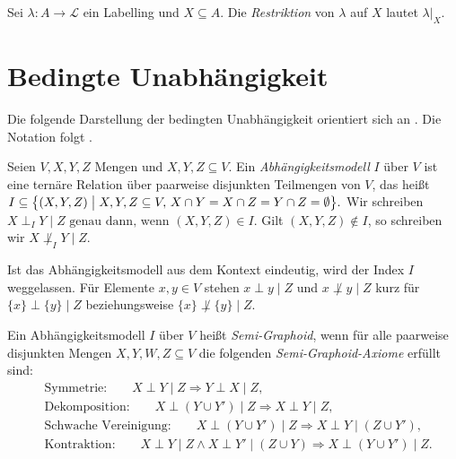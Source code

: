 \begin{Definition}
    \label{def:labelling-restriction}
    Sei \(\lambda\colon A\to\mathcal{L}\) ein Labelling und \(X\subseteq A\).
    Die \emph{Restriktion} von \(\lambda\) auf \(X\) lautet
    \(
        \lambda|_X
    \).
\end{Definition}

\section{Bedingte Unabhängigkeit}
\label{sec:conditional-independence}

Die folgende Darstellung der bedingten Unabhängigkeit orientiert
sich an \textcite{pearl:paz:1986:graphoids}. Die Notation folgt
\textcite{bluemel:2025:independence-aba}.

\begin{Definition}
    \label{def:dependency-model}
    Seien \(V, X, Y, Z\) Mengen und \(X,Y,Z \subseteq V\). Ein \emph{Abhängigkeitsmodell} \(I\) über \(V\)
    ist eine ternäre Relation über paarweise disjunkten Teilmengen von \(V\),
    das heißt
    \(
        I \subseteq
        \bigl\{(X,Y,Z) \bigm| X,Y,Z\subseteq V,\,
        X\cap Y=X\cap Z=Y\cap Z=\emptyset\bigr\}.
    \)
    Wir schreiben
    \(
        X\perp_I Y\mid Z \text{ genau dann, wenn }
        (X,Y,Z)\in I.
    \)
    Gilt \((X,Y,Z)\notin I\), so
    schreiben wir \(X\not\perp_I Y\mid Z\).
\end{Definition}
Ist das Abhängigkeitsmodell aus dem Kontext eindeutig,
wird der Index \(I\) weggelassen. Für Elemente \(x,y\in V\) stehen
\(x\perp y\mid Z\) und \(x\not\perp y\mid Z\) kurz für
\(\{x\}\perp\{y\}\mid Z\) beziehungsweise
\(\{x\}\not\perp\{y\}\mid Z\).

\begin{Definition}
    \label{def:semi-graphoid}
    Ein Abhängigkeitsmodell \(I\) über \(V\) heißt \emph{Semi-Graphoid},
    wenn für alle paarweise disjunkten Mengen
    \(X,Y,W,Z\subseteq V\) die folgenden
    \emph{Semi-Graphoid-Axiome} erfüllt sind:
    \begin{align*}
        &\text{Symmetrie:}\qquad
        X\perp Y\mid Z
        \Longrightarrow Y\perp X\mid Z,\\
        &\text{Dekomposition:}\qquad
        X\perp (Y\cup Y')\mid Z
        \Longrightarrow X\perp Y\mid Z,\\
        &\text{Schwache Vereinigung:}\qquad
        X\perp (Y\cup Y')\mid Z
        \Longrightarrow X\perp Y\mid (Z\cup Y'),\\
        &\text{Kontraktion:}\qquad
        X\perp Y\mid Z\land X\perp Y'\mid (Z\cup Y)
        \Longrightarrow X\perp (Y\cup Y')\mid Z.
    \end{align*}
\end{Definition}

